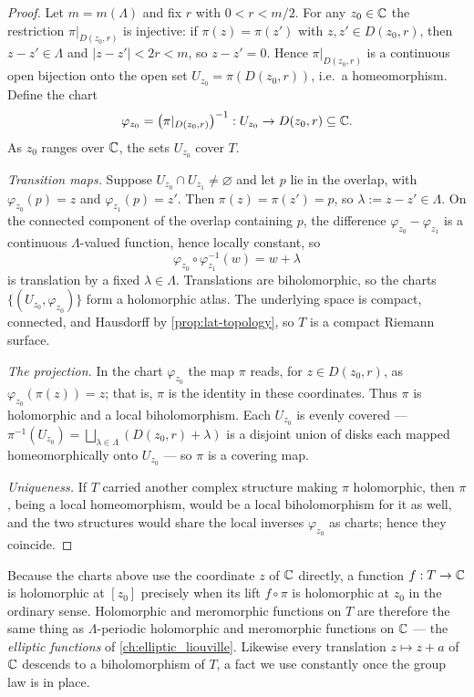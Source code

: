 \begin{proof}
Let \(m = m(\Lambda)\) and fix \(r\) with \(0 < r < m/2\). For any
\(z_0 \in \mathbb{C}\) the restriction \(\pi|_{D(z_0, r)}\) is injective: if
\(\pi(z) = \pi(z')\) with \(z, z' \in D(z_0, r)\), then
\(z - z' \in \Lambda\) and \(|z - z'| < 2r < m\), so \(z - z' = 0\). Hence
\(\pi|_{D(z_0,r)}\) is a continuous open bijection onto the open set
\(U_{z_0} = \pi(D(z_0, r))\), i.e.\ a homeomorphism. Define the chart
\[
  \varphi_{z_0} = \bigl(\pi|_{D(z_0,r)}\bigr)^{-1} : U_{z_0} \to D(z_0, r)
  \subseteq \mathbb{C} .
\]
As \(z_0\) ranges over \(\mathbb{C}\), the sets \(U_{z_0}\) cover \(T\).

\emph{Transition maps.} Suppose \(U_{z_0} \cap U_{z_1} \ne \varnothing\) and let
\(p\) lie in the overlap, with \(\varphi_{z_0}(p) = z\) and
\(\varphi_{z_1}(p) = z'\). Then \(\pi(z) = \pi(z') = p\), so
\(\lambda := z - z' \in \Lambda\). On the connected component of the overlap
containing \(p\), the difference \(\varphi_{z_0} - \varphi_{z_1}\) is a
continuous \(\Lambda\)-valued function, hence locally constant, so
\[
  \varphi_{z_0} \circ \varphi_{z_1}^{-1}(w) = w + \lambda
\]
is translation by a fixed \(\lambda \in \Lambda\). Translations are
biholomorphic, so the charts \(\{(U_{z_0}, \varphi_{z_0})\}\) form a holomorphic
atlas. The underlying space is compact, connected, and Hausdorff by
\cref{prop:lat-topology}, so \(T\) is a compact Riemann surface.

\emph{The projection.} In the chart \(\varphi_{z_0}\) the map \(\pi\) reads, for
\(z \in D(z_0, r)\), as \(\varphi_{z_0}(\pi(z)) = z\); that is, \(\pi\) is the
identity in these coordinates. Thus \(\pi\) is holomorphic and a local
biholomorphism. Each \(U_{z_0}\) is evenly covered ---
\(\pi^{-1}(U_{z_0}) = \bigsqcup_{\lambda \in \Lambda} (D(z_0,r) + \lambda)\) is a
disjoint union of disks each mapped homeomorphically onto \(U_{z_0}\) --- so
\(\pi\) is a covering map.

\emph{Uniqueness.} If \(T\) carried another complex structure making \(\pi\)
holomorphic, then \(\pi\), being a local homeomorphism, would be a local
biholomorphism for it as well, and the two structures would share the local
inverses \(\varphi_{z_0}\) as charts; hence they coincide.
\end{proof}

\begin{remark}
\label{rem:lat-translation-holo}
Because the charts above use the coordinate \(z\) of \(\mathbb{C}\) directly, a function
\(f : T \to \mathbb{C}\) is holomorphic at \([z_0]\) precisely when its lift
\(f \circ \pi\) is holomorphic at \(z_0\) in the ordinary sense. Holomorphic and
meromorphic functions on \(T\) are therefore the same thing as
\(\Lambda\)-periodic holomorphic and meromorphic functions on \(\mathbb{C}\) --- the
\emph{elliptic functions} of \cref{ch:elliptic_liouville}. Likewise every
translation \(z \mapsto z + a\) of \(\mathbb{C}\) descends to a biholomorphism of \(T\),
a fact we use constantly once the group law is in place.
\end{remark}

